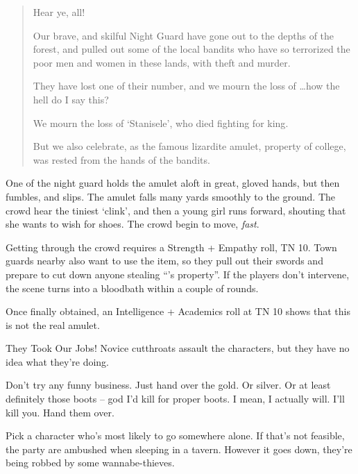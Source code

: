 \begin{multicols}{2}
\begin{boxtext}
	\begin{quotation}
		Hear ye, all!

		Our brave, and skilful Night Guard have gone out to the depths of the forest, and pulled out some of the local bandits who have so terrorized the poor men and women in these lands, with theft and murder.

		They have lost one of their number, and we mourn the loss of \ldots how the hell do I say this?

		We mourn the loss of `Stanisele', who died fighting for \gls{king}.

		But we also celebrate, as the famous lizardite amulet, property of \gls{college}, was rested from the hands of the bandits.

	\end{quotation}

	One of the night guard holds the amulet aloft in great, gloved hands, but then fumbles, and slips.  The amulet falls many yards smoothly to the ground.  The crowd hear the tiniest `clink', and then a young girl runs forward, shouting that she wants to wish for shoes.  The crowd begin to move, \emph{fast}.

\end{boxtext}

Getting through the crowd requires a Strength + Empathy roll, TN 10.
Town guards nearby also want to use the item, so they pull out their swords and prepare to cut down anyone stealing ``'s property''.
If the players don't intervene, the scene turns into a bloodbath within a couple of rounds.

Once finally obtained, an Intelligence + Academics roll at TN 10 shows that this is not the real amulet.

{They Took Our Jobs!}%
{Novice cutthroats assault the characters, but they have no idea what they're doing.}%

\begin{speechtext}

	Don't try any funny business.  Just hand over the gold. Or silver.  Or at least definitely those boots -- god I'd kill for proper boots.  I mean, I actually will.  I'll kill you.  Hand them over.

\end{speechtext}

Pick a character who's most likely to go somewhere alone.  If that's not feasible, the party are ambushed when sleeping in a tavern.
However it goes down, they're being robbed by some wannabe-thieves.


\end{multicols}
